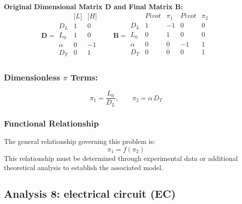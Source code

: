 \textbf{Original Dimensional Matrix $\mathbf{D}$ and Final Matrix $\mathbf{B}$:}
\begin{equation}\mathbf{D} = \begin{array}{r|rr}
& \text{[}L\text{]} & \text{[}H\text{]} \\
\hline
D_L & 1 & 0 \\
L_0 & 1 & 0 \\
\alpha & 0 & -1 \\
D_T & 0 & 1 \\
\end{array}
\qquad
\mathbf{B} = \begin{array}{r|rrrr}
& Pivot & \pi_{1} & Pivot & \pi_{2} \\
\hline
D_L & 1 & -1 & 0 & 0 \\
L_0 & 0 & 1 & 0 & 0 \\
\alpha & 0 & 0 & -1 & 1 \\
D_T & 0 & 0 & 0 & 1 \\
\end{array}\end{equation}

\subsubsection*{Dimensionless $\pi$ Terms:}
\begin{equation}
\pi_{1} = \frac{L_0}{D_L}, \qquad
\pi_{2} = \alpha \, D_T
\end{equation}

\subsubsection*{Functional Relationship}
The general relationship governing this problem is:
\begin{equation}
\pi_1 = f(\pi_2)
\end{equation}
This relationship must be determined through experimental data or additional theoretical analysis to establish the associated model.

\subsection{Analysis 8: electrical circuit (EC)}
\label{sec:Electrical_Circuit_EC}

